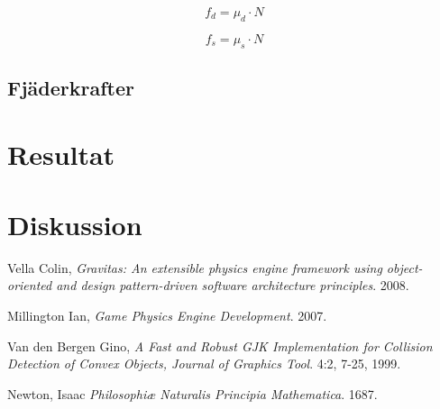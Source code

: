 \documentclass[a4paper,12pt,twopage,swedish]{article}
\begin{document}
\begin{equation}\label{eq:static_friction}
f_d = \mu_d \cdot N
\end{equation}

\begin{equation}\label{eq:dynamic_friction}
f_s = \mu_s \cdot N
\end{equation}

\subsection{Fjäderkrafter}
\section{Resultat}
\section{Diskussion}
\clearpage
\begin{thebibliography}{9}

  Vella Colin,
  \emph{Gravitas: An extensible physics engine framework using object-oriented and design pattern-driven software architecture principles}.
  2008.

  Millington Ian,
  \emph{Game Physics Engine Development}.
  2007.

  Van den Bergen Gino,
  \emph{A Fast and Robust GJK Implementation for Collision Detection of Convex Objects, Journal of Graphics Tool}.
  4:2, 7-25,
  1999.

  Newton, Isaac
  \emph{Philosophiæ Naturalis Principia Mathematica}.
  1687.

\end{thebibliography}
\end{document}
